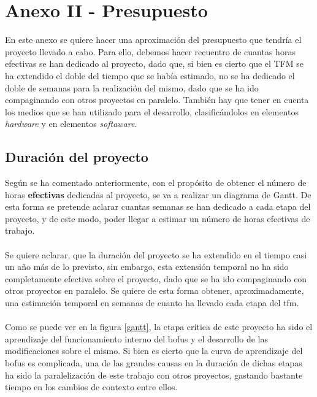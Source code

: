 \chapter{Anexo II - Presupuesto}

En este anexo se quiere hacer una aproximación del presupuesto que tendría el proyecto llevado a cabo. Para ello, debemos hacer recuentro de cuantas horas efectivas se han dedicado al proyecto, dado que, si bien es cierto que el TFM se ha extendido el doble del tiempo que se había estimado, no se ha dedicado el doble de semanas para la realización del mismo, dado que se ha ido compaginando con otros proyectos en paralelo. También hay que tener en cuenta los medios que se han utilizado para el desarrollo, clasificándolos en elementos \textit{hardware} y en elementos \textit{softaware}.

\section{Duración del proyecto}


Según se ha comentado anteriormente, con el propósito de obtener el número de horas \textbf{efectivas} dedicadas al proyecto, se va a realizar un diagrama de Gantt. De esta forma se pretende aclarar cuantas semanas se han dedicado a cada etapa del proyecto, y de este modo, poder llegar a estimar un número de horas efectivas de trabajo.\\
\\
Se quiere aclarar, que la duración del proyecto se ha extendido en el tiempo casi un año más de lo previsto, sin embargo, esta extensión temporal no ha sido completamente efectiva sobre el proyecto, dado que se ha ido compaginando con otros proyectos en paralelo. Se quiere de esta forma obtener, aproximadamente, una estimación temporal en semanas de cuanto ha llevado cada etapa del \gls{tfm}.\\
\\
Como se puede ver en la figura \ref{gantt}, la etapa crítica de este proyecto ha sido el aprendizaje del funcionamiento interno del \gls{bofus} y el desarrollo de las modificaciones sobre el mismo. Si bien es cierto que la curva de aprendizaje del \gls{bofus} es complicada, una de las grandes causas en la duración de dichas etapas ha sido la paralelización de este trabajo con otros proyectos, gastando bastante tiempo en los cambios de contexto entre ellos.\\

